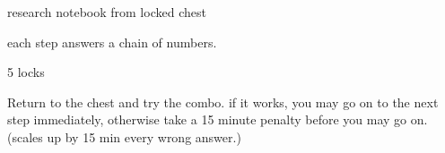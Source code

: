 \documentclass[green]{NeptuneBall}
\begin{document}
\name{\gGlowShell{}}

research notebook from locked chest

each step answers a chain of numbers.

5 locks

Return to the chest and try the combo. if it works, you may go on to the next step immediately, otherwise take a 15 minute penalty before you may go on. (scales up by 15 min every wrong answer.)
\end{document}
